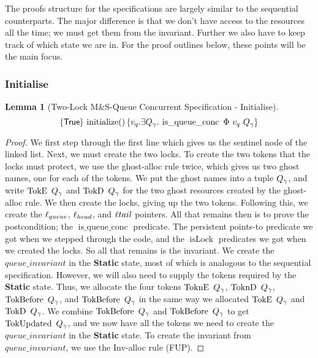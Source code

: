 \documentclass[a4paper, 11pt]{report}
\newtheorem{lemma}[theorem]{Lemma}
\newcommand{\isLock}{\operatorname{isLock}}
\newcommand{\initialise}{\operatorname{initialize}}
\newcommand{\isqueueconc}{\operatorname{is\_queue\_conc}}
\newcommand{\StaticState}{\textbf{Static}}
\newcommand{\Qg}{Q_\gname}
\newcommand{\TokE}[1]{\operatorname{TokE}\ #1}
\newcommand{\TokEQg}{\TokE{\Qg}}
\newcommand{\ToknE}[1]{\operatorname{ToknE}\ #1}
\newcommand{\ToknEQg}{\ToknE{\Qg}}
\newcommand{\TokD}[1]{\operatorname{TokD}\ #1}
\newcommand{\TokDQg}{\TokD{\Qg}}
\newcommand{\ToknD}[1]{\operatorname{ToknD}\ #1}
\newcommand{\ToknDQg}{\ToknD{\Qg}}
\newcommand{\TokBefore}[1]{\operatorname{TokBefore}\ #1}
\newcommand{\TokBeforeQg}{\TokBefore{\Qg}}
\newcommand{\TokAfterQg}{\TokBefore{\Qg}}
\newcommand{\TokUpdated}[1]{\operatorname{TokUpdated}\ #1}
\newcommand{\TokUpdatedQg}{\TokUpdated{\Qg}}
\newcommand{\tlconcspecinit}{\hoare{\TRUE}{\initialise \TT}{v_q . \Exists Q_\gname. \isqueueconc\ \Phi \ v_q \ Q_\gname}}
\begin{document}
The proofs structure for the specifications are largely similar to the sequential counterparts. The major difference is that we don't have access to the resources all the time; we must get them from the invariant. Further we also have to keep track of which state we are in. For the proof outlines below, these points will be the main focus.

\subsubsection{Initialise}
\begin{lemma}[Two-Lock M\&S-Queue Concurrent Specification - Initialise]\label{TLMSQ:spec:conc:init}
  \begin{equation*}
    \tlconcspecinit
  \end{equation*}
\end{lemma}
\begin{proof}
We first step through the first line which gives us the sentinel node of the linked list. Next, we must create the two locks. To create the two tokens that the locks must protect, we use the ghost-alloc rule twice, which gives us two ghost names, one for each of the tokens. We put the ghost names into a tuple $\Qg$, and write $\TokEQg$ and $\TokDQg$ for the two ghost resources created by the ghost-alloc rule. We then create the locks, giving up the two tokens. Following this, we create the $\ell_{queue}$, $\ell_{head}$, and $\ell{tail}$ pointers. All that remains then is to prove the postcondition; the $\isqueueconc$ predicate. The persistent points-to predicate we got when we stepped through the code, and the $\isLock$ predicates we got when we created the locks. So all that remains is the invariant. We create the $queue\_invariant$ in the \StaticState{} state, most of which is analogous to the sequential specification. However, we will also need to supply the tokens required by the \StaticState{} state. Thus, we allocate the four tokens $\ToknEQg$, $\ToknDQg$, $\TokBeforeQg$, and $\TokAfterQg$ in the same way we allocated $\TokEQg$ and $\TokDQg$. We combine $\TokBeforeQg$ and $\TokAfterQg$ to get $\TokUpdatedQg$, and we now have all the tokens we need to create the $queue\_invariant$ in the \StaticState{} state. To create the invariant from $queue\_invariant$, we use the Inv-alloc rule (FUP).
\end{proof}
\end{document}
